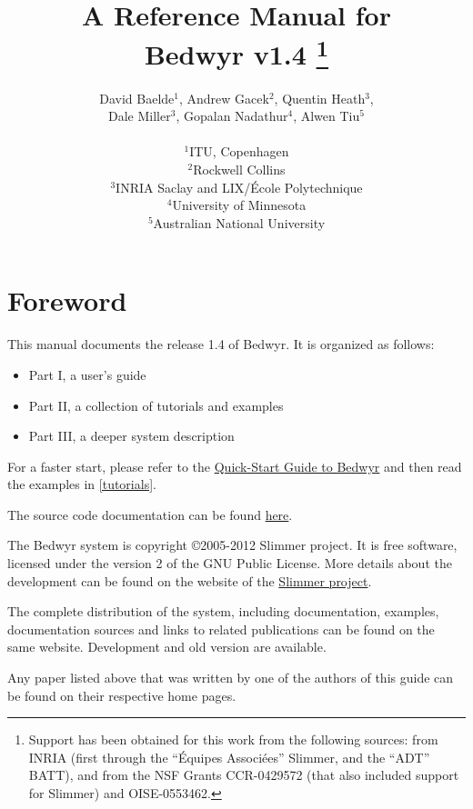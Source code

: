 \documentclass[a4paper]{article} %
\title{{\Huge A Reference Manual for\\Bedwyr v1.4}
   \thanks{Support has been obtained for this work from the following
           sources: from INRIA (first through the ``\'Equipes
           Associ{\'e}es'' Slimmer, and the ``ADT'' BATT),
           and from the NSF Grants CCR-0429572 (that also included
           support for Slimmer) and OISE-0553462.}
}
\author{David Baelde$^1$,
        Andrew Gacek$^2$,
        Quentin Heath$^3$, \\
        Dale Miller$^3$,
        Gopalan Nadathur$^4$,
        Alwen Tiu$^5$ \\ \\
$^1$ITU, Copenhagen\\
$^2$Rockwell Collins\\
$^3$INRIA Saclay and LIX/\'Ecole Polytechnique\\
$^4$University of Minnesota\\
$^5$Australian National University
}
\begin{document}
\maketitle
\tableofcontents
\newpage

\section*{Foreword}

This manual documents the release 1.4 of Bedwyr.
It is organized as follows:
\begin{itemize}
  \item Part I, a user's guide
  \item Part II, a collection of tutorials and examples
  \item Part III, a deeper system description
\end{itemize}

For a faster start, please refer to the
\href{http://slimmer.gforge.inria.fr/bedwyr/}
  {Quick-Start Guide to Bedwyr}
and then read the examples in \partname \ref{tutorials}.

The source code documentation can be found
\href{http://slimmer.gforge.inria.fr/bedwyr/}{here}.

The Bedwyr system is copyright \copyright 2005-2012 Slimmer project.
It is free software, licensed under the version 2 of the GNU Public License.
More details about the development can be found on the website of the
\href{http://slimmer.gforge.inria.fr/}{Slimmer project}.

The complete distribution of the system, including documentation,
examples, documentation sources and links to related publications
can be found on the same website.
Development and old version are available.







\appendix



\noindent Any paper listed above that was written by one of the
authors of this guide can be found on their respective home pages.
\end{document}
